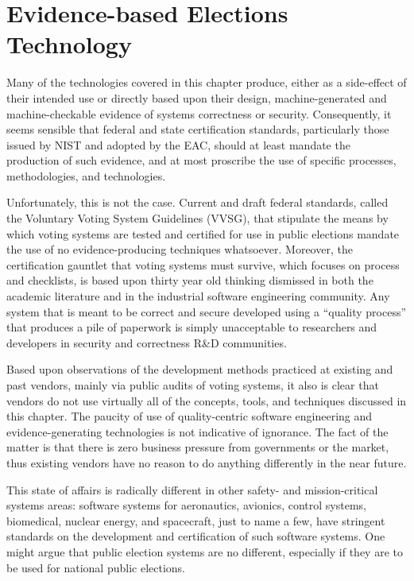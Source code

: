 \section{Evidence-based Elections Technology}

Many of the technologies covered in this chapter produce, either as a
side-effect of their intended use or directly based upon their design,
machine-generated and machine-checkable evidence of systems
correctness or security.  Consequently, it seems sensible that federal
and state certification standards, particularly those issued by NIST
and adopted by the EAC, should at least mandate the production of such
evidence, and at most proscribe the use of specific processes,
methodologies, and technologies.  

Unfortunately, this is not the case.  Current and draft federal
standards, called the Voluntary Voting System Guidelines (VVSG), that
stipulate the means by which voting systems are tested and certified
for use in public elections mandate the use of no evidence-producing
techniques whatsoever.  Moreover, the certification gauntlet that
voting systems must survive, which focuses on process and checklists,
is based upon thirty year old thinking dismissed in both the academic
literature and in the industrial software engineering community. Any
system that is meant to be correct and secure developed using a
``quality process'' that produces a pile of paperwork is simply
unacceptable to researchers and developers in security and correctness
R\&D communities.

Based upon observations of the development methods practiced at
existing and past vendors, mainly via public audits of voting systems,
it also is clear that vendors do not use virtually all of the
concepts, tools, and techniques discussed in this chapter.  The
paucity of use of quality-centric software engineering and
evidence-generating technologies is not indicative of ignorance.  The
fact of the matter is that there is zero business pressure from
governments or the market, thus existing vendors have no reason to
do anything differently in the near future.

This state of affairs is radically different in other safety- and
mission-critical systems areas: software systems for aeronautics,
avionics, control systems, biomedical, nuclear energy, and spacecraft,
just to name a few, have stringent standards on the development and
certification of such software systems.  One might argue that public
election systems are no different, especially if they are to be used
for national public elections.

